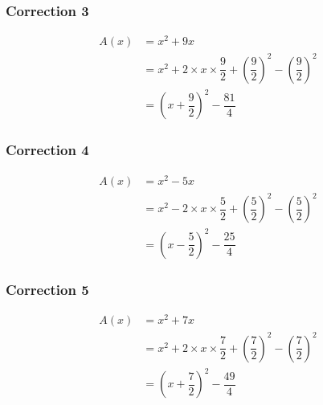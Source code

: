 \documentclass[15pt, mathserif]{beamer}
\begin{document}
\begin{frame}
\vspace{-10mm}
	\frametitle{Correction 3}
\begin{align*} A(x) &= x^2+9x\\ 
&=x^2+2\times x \times \dfrac{9}{2}+\left(\dfrac{9}{2}\right)^2- \left(\dfrac{9}{2}\right)^2\\ 
&=\left( x+\dfrac{9}{2}\right)^2-\dfrac{81}{4}
 \end{align*} 

 \bigskip\end{frame}


\begin{frame}
\vspace{-10mm}
	\frametitle{Correction 4}
\begin{align*} A(x) &= x^2-5x\\ 
&=x^2-2\times x \times \dfrac{5}{2}+\left(\dfrac{5}{2}\right)^2- \left(\dfrac{5}{2}\right)^2\\ 
&=\left( x-\dfrac{5}{2}\right)^2-\dfrac{25}{4}
 \end{align*} 

 \bigskip\end{frame}


\begin{frame}
\vspace{-10mm}
	\frametitle{Correction 5}
\begin{align*} A(x) &= x^2+7x\\ 
&=x^2+2\times x \times \dfrac{7}{2}+\left(\dfrac{7}{2}\right)^2- \left(\dfrac{7}{2}\right)^2\\ 
&=\left( x+\dfrac{7}{2}\right)^2-\dfrac{49}{4}
 \end{align*} 

 \bigskip\end{frame}
\end{document}
